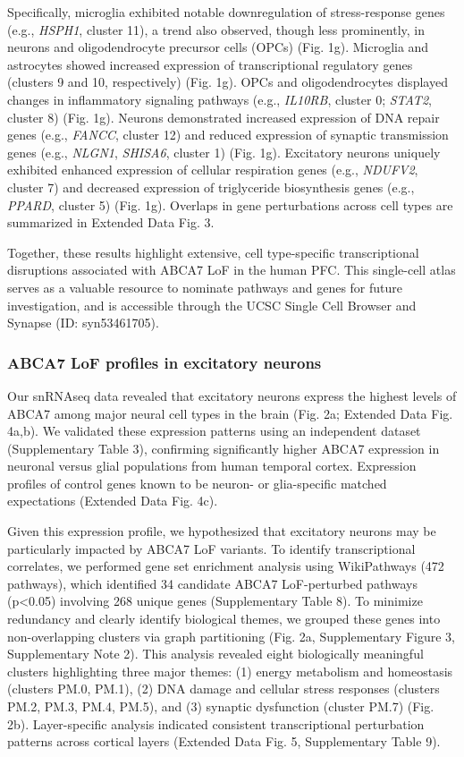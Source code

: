 Specifically, microglia exhibited notable downregulation of stress-response genes (e.g., \textit{HSPH1}, cluster 11), a trend also observed, though less prominently, in neurons and oligodendrocyte precursor cells (OPCs) (Fig. 1g). Microglia and astrocytes showed increased expression of transcriptional regulatory genes (clusters 9 and 10, respectively) (Fig. 1g). OPCs and oligodendrocytes displayed changes in inflammatory signaling pathways (e.g., \textit{IL10RB}, cluster 0; \textit{STAT2}, cluster 8) (Fig. 1g). Neurons demonstrated increased expression of DNA repair genes (e.g., \textit{FANCC}, cluster 12) and reduced expression of synaptic transmission genes (e.g., \textit{NLGN1}, \textit{SHISA6}, cluster 1) (Fig. 1g). Excitatory neurons uniquely exhibited enhanced expression of cellular respiration genes (e.g., \textit{NDUFV2}, cluster 7) and decreased expression of triglyceride biosynthesis genes (e.g., \textit{PPARD}, cluster 5) (Fig. 1g). Overlaps in gene perturbations across cell types are summarized in Extended Data Fig. 3.

Together, these results highlight extensive, cell type-specific transcriptional disruptions associated with ABCA7 LoF in the human PFC. This single-cell atlas serves as a valuable resource to nominate pathways and genes for future investigation, and is accessible through the UCSC Single Cell Browser and Synapse (ID: syn53461705).

\subsubsection{ABCA7 LoF profiles in excitatory neurons}
Our snRNAseq data revealed that excitatory neurons express the highest levels of ABCA7 among major neural cell types in the brain (Fig. 2a; Extended Data Fig. 4a,b). We validated these expression patterns using an independent dataset \supercite{Welch2022-ef} (Supplementary Table 3), confirming significantly higher ABCA7 expression in neuronal versus glial populations from human temporal cortex. Expression profiles of control genes known to be neuron- or glia-specific matched expectations (Extended Data Fig. 4c).

Given this expression profile, we hypothesized that excitatory neurons may be particularly impacted by ABCA7 LoF variants. To identify transcriptional correlates, we performed gene set enrichment analysis using WikiPathways (472 pathways), which identified 34 candidate ABCA7 LoF-perturbed pathways (p<0.05) involving 268 unique genes \supercite{Subramanian2005-pu} (Supplementary Table 8). To minimize redundancy and clearly identify biological themes, we grouped these genes into non-overlapping clusters via graph partitioning (Fig. 2a, Supplementary Figure 3, Supplementary Note 2). This analysis revealed eight biologically meaningful clusters highlighting three major themes: (1) energy metabolism and homeostasis (clusters PM.0, PM.1), (2) DNA damage and cellular stress responses (clusters PM.2, PM.3, PM.4, PM.5), and (3) synaptic dysfunction (cluster PM.7) (Fig. 2b). Layer-specific analysis indicated consistent transcriptional perturbation patterns across cortical layers (Extended Data Fig. 5, Supplementary Table 9).

